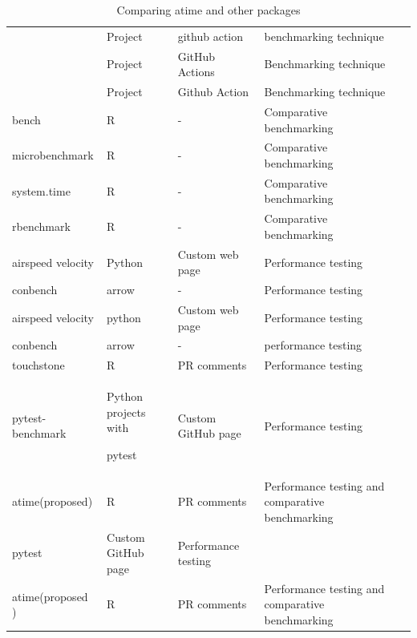 \begin{table}[H]
    \centering
        \caption{Comparing atime and other packages}
    \begin{tabular}{|m{2.6cm}|m{2cm}|m{3cm}|m{3cm}|m{4cm}|}
    \hline

         & Project & github action & benchmarking technique\\

         & Project & GitHub Actions & Benchmarking technique\\

         & Project & Github Action & Benchmarking technique\\

\hline
bench & R  & - &  Comparative benchmarking \\

\hline
microbenchmark & R & - & Comparative benchmarking\\
\hline
system.time & R & - & Comparative benchmarking\\
\hline
rbenchmark & R & - & Comparative benchmarking\\
\hline

airspeed velocity & Python & Custom web page & Performance testing\\
\hline
conbench & arrow  & - & Performance testing\\

airspeed velocity & python & Custom web page & Performance testing\\
\hline
conbench & arrow  & - & performance testing\\

\hline
touchstone & R & PR comments & Performance testing\\
\hline
pytest-benchmark & Python
projects with

pytest & Custom GitHub page & Performance testing\\
\hline
atime(proposed) & R & PR comments & Performance testing and comparative benchmarking\\

pytest &  Custom GitHub page & Performance testing\\
\hline
atime(proposed ) & R  & PR comments & Performance testing and comparative benchmarking\\

\hline
    \end{tabular}
    \label{tab:my_label}
\end{table}


